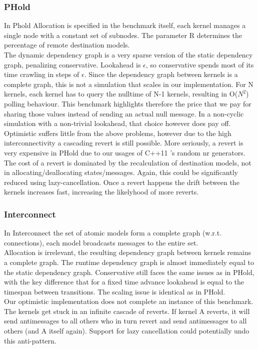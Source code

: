 \subsubsection{PHold}
In Phold \cite{PHOLD} Allocation is specified in the benchmark itself, each kernel manages a single node with a constant set of subnodes. The parameter R determines the percentage of remote destination models.\\
The dynamic dependency graph is a very sparse version of the static dependency graph, penalizing conservative. Lookahead is $\epsilon$, so conservative spends most of its time crawling in steps of $\epsilon$. Since the dependency graph between kernels is a complete graph, this is not a simulation that scales in our implementation. For N kernels, each kernel has to query the nulltime of N-1 kernels, resulting in O($N^2$) polling behaviour. This benchmark highlights therefore the price that we pay for sharing those values instead of sending an actual null message. In a non-cyclic simulation with a non-trivial lookahead, that choice however does pay off.\\
Optimistic suffers little from the above problems, however due to the high interconnectivity a cascading revert is still possible. More seriously, a revert is very expensive in PHold due to our usages of C++11 's random nr generators. The cost of a revert is dominated by the recalculation of destination models, not in allocating/deallocating states/messages. Again, this could be significantly reduced using lazy-cancellation. Once a revert happens the drift between the kernels increases fast, increasing the likelyhood of more reverts. 

\subsubsection{Interconnect}
In Interconnect %
the set of atomic models form a complete graph (w.r.t. connections), each model broadcasts messages to the entire set. \\
Allocation is irrelevant, the resulting dependency graph between kernels remains  a complete graph. The runtime dependency graph is almost immediately equal to the static dependency graph.
Conservative still faces the same issues as in PHold, with the key difference that for a fixed time advance lookahead is equal to the timespan between transitions. The scaling issue is identical as in PHold.\\
Our optimistic implementation does not complete an instance of this benchmark. The kernels get stuck in an infinite cascade of reverts. If kernel A reverts, it will send antimessages to all others who in turn revert and send antimessages to all others (and A itself again). Support for lazy cancellation could potentially undo this anti-pattern.
